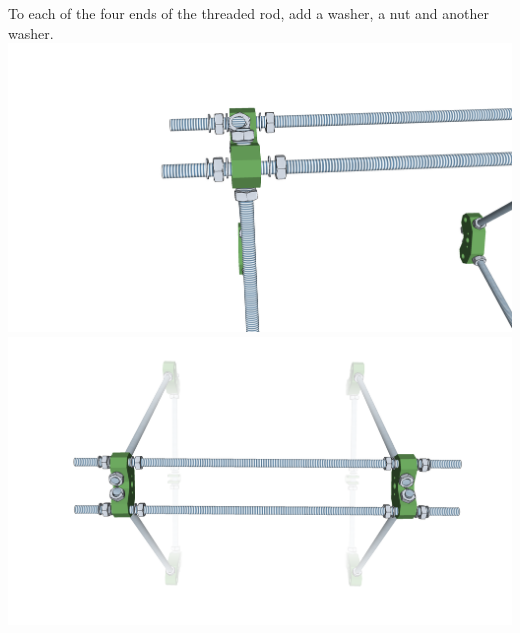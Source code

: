 \documentclass[twoside,a4paper,titlepage]{memoir}
\begin{document}
	\section{}
	To each of the four ends of the threaded rod, add a washer, a nut and another washer.\\
	\includegraphics[width=1\linewidth]{graphics/ch4_4_1.png}
	\includegraphics[width=1\linewidth]{graphics/ch4_4_2.png}
	
\end{document}

